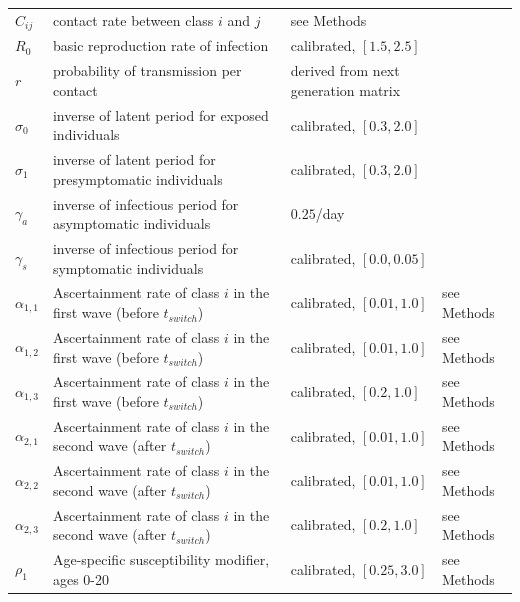 \begin{table}[H]
\begin{tabular}{l p{5.5cm} l l}
  $C_{ij}$    & contact rate between class $i$ and $j$    & see Methods & \cite{prem2020projecting} \\
  $R_0$ & basic reproduction rate of infection & calibrated, $[1.5,2.5]$ & \cite{hilton2020estimation,googlemobility, ontariocoviddata}  \\
  $r$         & probability of transmission per contact   & derived from next generation matrix & \cite{diekmann2010construction} \\
  $\sigma_0$    & inverse of latent period for exposed individuals                  & calibrated, $[0.3,2.0]$ & \cite{googlemobility, ontariocoviddata,nishiura2020serial,lauer2020incubation,tindale2020transmission} \\
  $\sigma_1$    & inverse of latent period for presymptomatic individuals & calibrated, $[0.3,2.0]$ & \cite{googlemobility, ontariocoviddata,nishiura2020serial,lauer2020incubation,tindale2020transmission} \\
  $\gamma_a$    & inverse of infectious period for asymptomatic individuals & $0.25$/day &  \cite{nishiura2020serial,lauer2020incubation,tindale2020transmission} \\
  $\gamma_s$    & inverse of infectious period for symptomatic individuals  & calibrated, $[0.0,0.05]$ & \cite{googlemobility, ontariocoviddata,nishiura2020serial,lauer2020incubation,tindale2020transmission} \\
  $\alpha_{1,1}$ & Ascertainment rate of class $i$ in the first wave (before $t_{switch}$) & calibrated, $[0.01,1.0]$ & see Methods\\
  $\alpha_{1,2}$ & Ascertainment rate of class $i$  in the first wave (before $t_{switch}$) & calibrated, $[0.01,1.0]$ & see Methods\\
  $\alpha_{1,3}$ & Ascertainment rate of class $i$ in the first wave (before $t_{switch}$) & calibrated, $[0.2,1.0]$ & see Methods\\
  $\alpha_{2,1}$ & Ascertainment rate of class $i$  in the second wave (after $t_{switch}$)& calibrated, $[0.01,1.0]$ & see Methods\\
  $\alpha_{2,2}$ & Ascertainment rate of class $i$ in the second wave (after $t_{switch}$) & calibrated, $[0.01,1.0]$ & see Methods\\
  $\alpha_{2,3}$ & Ascertainment rate of class $i$  in the second wave (after $t_{switch}$)& calibrated, $[0.2,1.0]$ & see Methods\\
  $\rho_1$ & Age-specific susceptibility modifier, ages 0-20 & calibrated, $[0.25,3.0]$  & see Methods\\

\end{tabular}
\end{table}
